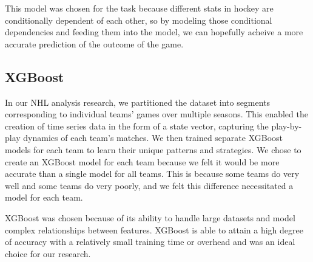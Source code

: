 \documentclass[11pt]{article}
\begin{document}
\begin{center}
\end{center}

This model was chosen for the task because different stats in hockey are conditionally dependent of each other, so by modeling those conditional
dependencies and feeding them into the model, we can hopefully acheive a more accurate prediction of the outcome of the game.

\subsection{XGBoost}

In our NHL analysis research, we partitioned the dataset into segments 
corresponding to individual teams' games over multiple seasons. 
This enabled the creation of time series data in the form of a state vector, capturing the 
play-by-play dynamics of each team's matches. We then trained 
separate XGBoost models for each team to learn their unique patterns 
and strategies. We chose to create an XGBoost model for each team
because we felt it would be more accurate than a single model for all teams.
This is because some teams do very well and some teams do very poorly, and
we felt this difference necessitated a model for each team.

XGBoost was chosen because of its ability to handle large datasets and model complex relationships between features. 
XGBoost is able to attain a high degree of accuracy with a relatively small training time or overhead and was an ideal choice for our research.
\end{document}

